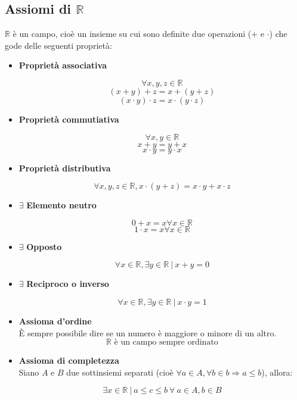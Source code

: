 \subsection{Assiomi di $\mathbb{R}$}
    $\mathbb{R}$ è un campo, cioè un insieme su cui sono definite due operazioni (+ e $\cdot$) che gode delle seguenti proprietà:

    \begin{itemize}
        \item \textbf{Proprietà associativa}
        \begin{Large}
            \[\forall x,y,z \in \mathbb{R}\]
            \[(x+y)+z = x+(y+z)\]
            \[(x \cdot y)\cdot z = x \cdot (y \cdot z)\]
        \end{Large}
            
        \item \textbf{Proprietà commutiativa}
        \begin{Large}
            \[\forall x,y \in \mathbb{R}\]
            \[x + y = y + x\]
            \[x \cdot y = y \cdot x\]
        \end{Large}
            
        \item \textbf{Proprietà distributiva}
        \begin{Large}
            \[\forall x,y,z \in \mathbb{R},x\cdot(y+z) = x \cdot y + x \cdot z\]
        \end{Large}
        \item $\exists$\textbf{ Elemento neutro}
        \begin{Large}
            \[0+x = x \forall x \in \mathbb{R}\]
            \[1 \cdot x = x \forall x \in \mathbb{R}\]
        \end{Large}
            
        \item $\exists$\textbf{ Opposto}
        \begin{Large}
            \[\forall x \in \mathbb{R},\exists y \in \mathbb{R}\ |\ x + y = 0\]
        \end{Large}
            
        \item $\exists$\textbf{ Reciproco o inverso}
        \begin{Large}
            \[\forall x \in \mathbb{R}, \exists y \in \mathbb{R}\ |\ x \cdot y = 1\]
        \end{Large}
            
        \item \textbf{Assioma d'ordine}\\
            È sempre possibile dire se un numero è maggiore o minore di un altro.
            \[\mathbb{R}\text{ è un campo sempre ordinato}\]
        \item \textbf{Assioma di completezza}\\
            Siano $A$ e $B$ due sottinsiemi separati (cioè $\forall a \in A,\forall b \in b \Rightarrow a \leq b$), 
            allora:
            \begin{Large}
            \[
                \exists x \in \mathbb{R}\ |\ a \leq c \leq b\ \forall\ a \in A, b \in B     
            \]
            \end{Large}
            

\end{itemize}
